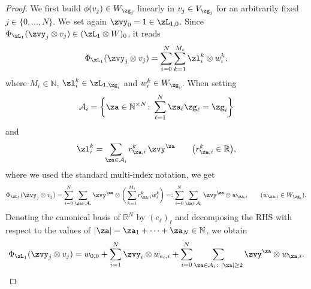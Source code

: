 \documentclass[pdftex]{sigma}%
\newcommand{\R}{{\mathbb R}}
\newcommand{\0}{\otimes}
\numberwithin{equation}{section}
\begin{document}
\begin{proof}
We first build $\phi(v_j)\in W_{\zg_j}$ linearly in $v_j\in V_{\zg_j}$ for an arbitrarily fixed $j\in\{0,\dots,N\}$. We~set again $\zvy_0=1\in\zL_{1,0}$. Since $\Phi_{\zL_1}(\zvy_j\0v_j)\in (\zL_1\0 W)_0$, it reads
\[
\Phi_{\zL_1}(\zvy_j\0v_j)=\sum_{i=0}^N\sum_{k=1}^{M_i} \zl_i^k\0 w_i^k,
\]
where $M_i\in \mathbb{N}$, $\zl_i^k\in\zL_{1,\zg_i}$ and $w_i^k\in W_{\zg_i}$. When setting
\[
\mathcal{A}_i=\bigg\{\za\in\mathbb{N}^{\times N}\colon \sum_{\ell=1}^N\za_\ell\zg_\ell=\zg_i\bigg\}
\]
and
\[
\zl_i^k=\sum_{\za\in\mathcal{A}_i}r_{\za,i}^k\,\zvy^\za\qquad\big(r_{\za,i}^k\in\R\big),
\]
where we used the standard multi-index notation, we get
\[
\Phi_{\zL_1}(\zvy_j\0v_j)=\sum_{i=0}^N\sum_{\za\in\mathcal{A}_i}\zvy^\za\0\bigg(\sum_{k=1}^{M_i}r_{\za,i}^k w_i^k\bigg)=:\sum_{i=0}^N\sum_{\za\in\mathcal{A}_i}\zvy^\za\0 w_{\za,i}\qquad
(w_{\za,i}\in W_{\zg_i}).
\]
Denoting the canonical basis of $\R^N$ by $(e_\ell)_\ell$ and decomposing the {\small RHS} with respect to the values of $|\za|=\za_1+\dots+\za_N\in\mathbb{N}$, we obtain
\begin{gather}\label{Defphi1}
\Phi_{\zL_1}(\zvy_j\0v_j)=w_{0,0}+\sum_{i=1}^N \zvy_i\0 w_{e_i,i}+\sum_{i=0}^N\sum_{\za\in\mathcal{A}_i\colon |\za|\ge 2}\zvy^\za\0 w_{\za,i}.
\end{gather}


\end{proof}
\end{document}
